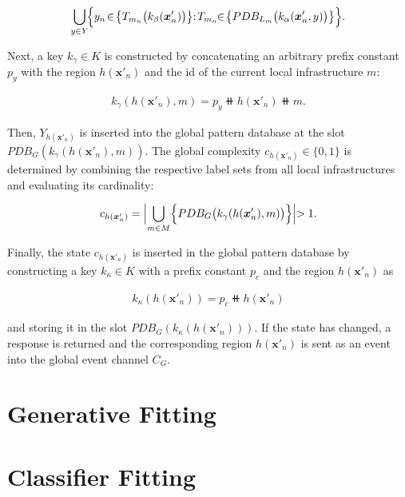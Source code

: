  \begin{align*}
    \bigcup_{y \in Y} \! \Bigl\{ y_n \! \in \! \bigl\{T_{m_n}\bigl(k_\beta(\bm{x}'_n)\bigl)\bigl\} : \! T_{m_n} \! \! \in \! \bigl\{PDB_{L_m}\bigl(k_\alpha(\bm{x}'_n, y) \bigl)\bigl\}\Bigl\}.
 \end{align*}

 Next, a key $k_\gamma \in K$ is constructed by concatenating an arbitrary prefix constant $p_y$ with the region $h(\bm{x}'_n)$ and the id of the current local infrastructure $m$:

\begin{align*}
    k_\gamma(h(\bm{x}'_n), m) = p_y \doubleplus h(\bm{x}'_n) \doubleplus m.
\end{align*}

 Then, $Y_{h(\bm{x}'_n)}$ is inserted into the global pattern database at the slot $PDB_G(k_\gamma(h(\bm{x}'_n), m))$. The global complexity $c_{h(\bm{x}'_n)} \in \{0, 1\}$ is determined by combining the respective label sets from all local infrastructures and evaluating its cardinality:
 
 \begin{align*}
    c_{h(\bm{x}'_n)} = \Bigl| \bigcup_{m \in M} \Bigl\{ PDB_G\bigl(k_\gamma(h(\bm{x}'_n), m)\bigl) \Bigl\}\Bigl| > 1.
 \end{align*}

 Finally, the state $c_{h(\bm{x}'_n)}$ is inserted in the global pattern database by constructing a key $k_\kappa \in K$ with a prefix constant $p_c$ and the region $h(\bm{x}'_n)$ as

 \begin{align*}
     k_\kappa(h(\bm{x}'_n)) = p_c \doubleplus h(\bm{x}'_n)
 \end{align*}

and storing it in the slot $PDB_G(k_\kappa(h(\bm{x}'_n)))$. If the state has changed, a response is returned and the corresponding region $h(\bm{x}'_n)$ is sent as an event into the global event channel $C_G$.

\section{Generative Fitting}

\section{Classifier Fitting}